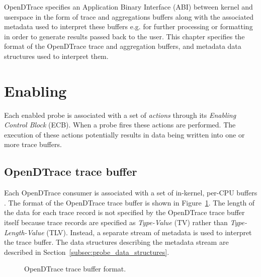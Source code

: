 OpenDTrace specifies an Application Binary Interface (ABI) between
kernel and userspace in the form of trace and aggregations buffers
along with the associated metadata used to interpret these buffers
e.g. for further processing or formatting in order to generate results
passed back to the user.  This chapter specifies the format of the
OpenDTrace trace and aggregation buffers, and metadata data structures
used to interpret them.

\section{Enabling}
\label{sec:probes}

Each enabled probe is associated with a set of \textit{actions}
through its \textit{Enabling Control Block} (ECB). When a probe fires
these actions are performed. The execution of these actions
potentially results in data being written into one or more trace
buffers.

\subsection{OpenDTrace trace buffer}
\label{subsec:trace_buffer}

Each OpenDTrace consumer is associated with a set of in-kernel,
per-CPU buffers \cite{DTrace2004}.  The format of the OpenDTrace trace
buffer is shown in Figure~\ref{fig:trace_buffer}.  The length of the
data for each trace record is not specified by the OpenDTrace trace
buffer itself because trace records are specified as
\textit{Type-Value} (TV) rather than \textit{Type-Length-Value} (TLV).
Instead, a separate stream of metadata is used to interpret the trace
buffer.  The data structures describing the metadata stream are
described in Section~\ref{subsec:probe_data_structures}.

\begin{figure}[!ht]
	\centering
	\caption{OpenDTrace trace buffer format.}
	\label{fig:trace_buffer}
\end{figure}

